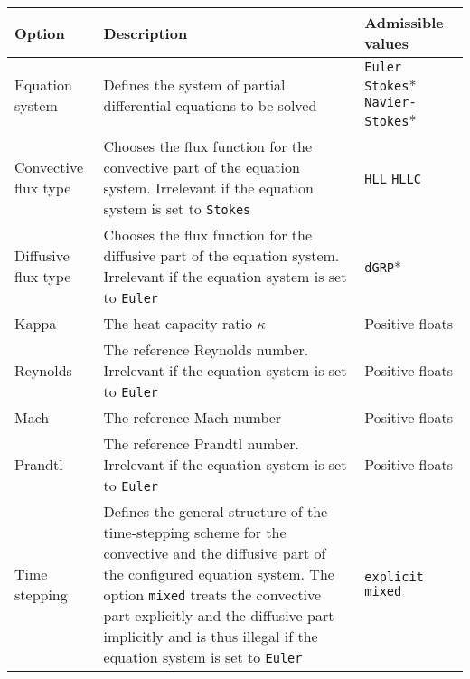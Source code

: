 \begin{table}
	\centering

	\begin{tabular}{l | p{8cm} | p{3cm}}
		\hline
		Option & Description & Admissible \hspace{3cm} values\\
		
		\hline\hline
		Equation system
		& Defines the system of partial differential equations to be solved
		& \texttt{Euler} \hspace{3cm} \texttt{Stokes}* \hspace{3cm} 
		\texttt{Navier-Stokes}* \\
		
		\hline
		Convective flux type
		& Chooses the flux function for the convective part of the equation system.
		Irrelevant if the equation system is set to \texttt{Stokes}
		& \texttt{HLL} \hspace{3cm} \texttt{HLLC}\\
		
		\hline
		Diffusive flux type
		& Chooses the flux function for the diffusive part of the equation system.
		Irrelevant if the equation system is set to \texttt{Euler}
		& \texttt{dGRP}*\\
		
		\hline
		Kappa
		& The heat capacity ratio $\kappa$
		& Positive floats\\
		
		\hline
		Reynolds
		& The reference Reynolds number. Irrelevant if the equation system is set to 
		\texttt{Euler}
		& Positive floats\\
		
		\hline
		Mach
		& The reference Mach number
		& Positive floats\\
		
		\hline
		Prandtl
		& The reference Prandtl number. Irrelevant if the equation system is set to 
		\texttt{Euler}
		& Positive floats\\
		
		\hline
		Time stepping
		& Defines the general structure of the time-stepping scheme for the
		convective and the diffusive part of the configured equation system. The
		option \texttt{mixed} treats the convective part explicitly and the
		diffusive part implicitly and is thus illegal if the equation system is
		set to \texttt{Euler}
		& \texttt{explicit} \hspace{3cm} \texttt{mixed}\\
		

\end{tabular}
\end{table}
